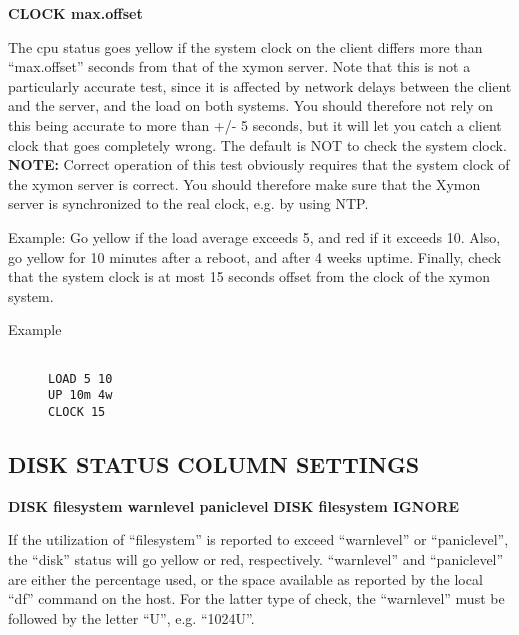  


 \textbf{CLOCK max.offset}



  The cpu status goes yellow if the system clock on the client differs more than ``max.offset'' seconds from that of the xymon server. Note that this is not a particularly accurate test, since it is affected by network delays between the client and the server, and the load on both systems. You should therefore not rely on this being accurate to more than +/- 5 seconds, but it will let you catch a client clock that goes completely wrong. The default is NOT to check the system clock.  
\textbf{NOTE:}
 Correct operation of this test obviously requires that the system clock of the xymon server is correct. You should therefore make sure that the Xymon server is synchronized to the real clock, e.g. by using NTP. 


 


  Example: Go yellow if the load average exceeds 5, and red if it exceeds 10. Also, go yellow for 10 minutes after a reboot, and after 4 weeks uptime. Finally, check that the system clock is at most 15 seconds offset from the clock of the xymon system. \begin{description}
\item[Example]

\begin{verbatim}

LOAD 5 10
UP 10m 4w
CLOCK 15

\end{verbatim}


\end{description}



 


 
\subsection{DISK STATUS COLUMN SETTINGS}


 \textbf{DISK filesystem warnlevel paniclevel}
 \textbf{DISK filesystem IGNORE}



  If the utilization of ``filesystem'' is reported to exceed ``warnlevel'' or ``paniclevel'', the ``disk'' status will go yellow or red, respectively. ``warnlevel'' and ``paniclevel'' are either the percentage used, or the space available as reported by the local ``df'' command on the host. For the latter type of check, the ``warnlevel'' must be followed by the letter ``U'', e.g. ``1024U''. 


